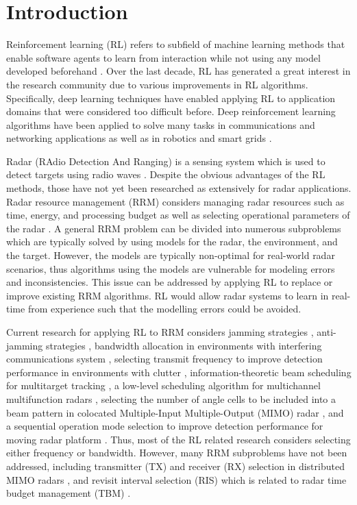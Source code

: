 \documentclass[english, 12pt, a4paper, elec, utf8, a-1b, online]{aaltothesis}
\begin{document}
\cleardoublepage

\section{Introduction}


Reinforcement learning (RL) refers to subfield of machine learning methods that enable software agents to learn from interaction while not using any model developed beforehand \cite{Sutton2018}. 
Over the last decade, RL has generated a great interest in the research community due to various improvements in RL algorithms. 
Specifically, deep learning techniques have enabled applying RL to application domains that were considered too difficult before. 
Deep reinforcement learning algorithms have been applied to solve many tasks in communications and networking applications \cite{Luong2018} as well as in robotics \cite{Kober2013} and smart grids \cite{Zhang2018}. 


Radar (RAdio Detection And Ranging) is a sensing system which is used to detect targets using radio waves \cite{Curry2011}.
Despite the obvious advantages of the RL methods, those have not yet been researched as extensively for radar applications.
Radar resource management (RRM) considers managing radar resources such as time, energy, and processing budget as well as selecting operational parameters of the radar \cite{Moo2016}. 
A general RRM problem can be divided into numerous subproblems which are typically solved by using models for the radar, the environment, and the target.
However, the models are typically non-optimal for real-world radar scenarios, thus algorithms using the models are vulnerable for modeling errors and inconsistencies.  
This issue can be addressed by applying RL to replace or improve existing RRM algorithms. 
RL would allow radar systems to learn in real-time from experience such that the modelling errors could be avoided. 

Current research for applying RL to RRM considers
jamming strategies \cite{Qiang2017, Wang2019, Wang2019a, Zhang2019},
anti-jamming strategies \cite{Kang2018, Ak2019}, 
bandwidth allocation in environments with interfering communications system \cite{Selvi2018, Kozy2019},
selecting transmit frequency to improve detection performance in environments with clutter \cite{Wabeke2010}, 
information-theoretic beam scheduling for multitarget tracking \cite{Kreucher2005, Xu2010},
a low-level scheduling algorithm for multichannel multifunction radars \cite{Shaghaghi2018},
selecting the number of angle cells to be included into a beam pattern in colocated Multiple-Input Multiple-Output (MIMO) radar \cite{Wang2018}, 
and a sequential operation mode selection to improve detection performance for moving radar platform \cite{Smits2008}.
Thus, most of the RL related research considers selecting  either frequency or bandwidth. 
However, many RRM subproblems have not been addressed, including transmitter (TX) and receiver (RX) selection in distributed MIMO radars \cite{Godrich2011a, Godrich2011, Sun2014}, and revisit interval selection (RIS) which is related to radar time budget management (TBM) \cite{Cohen1986, Gardner1988, Munu1992, ChengTing2007, Baek2010, Watson1993, Charlish2015, Keuk1975, Shin1995, Benoudnine2006, Esfahani2012}.
\end{document}
